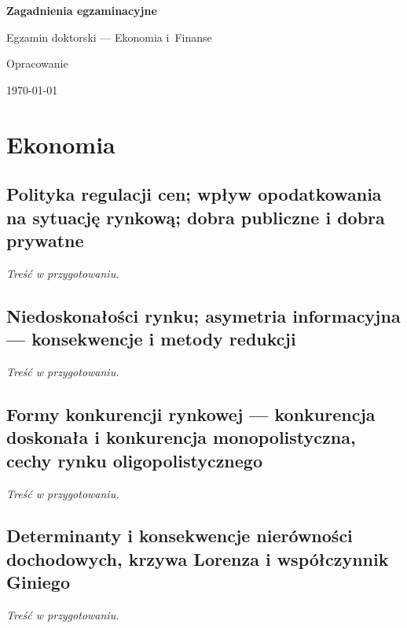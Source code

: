 \documentclass[12pt,a4paper]{report}
\begin{document}

\begin{titlepage}
  \centering
  \vspace*{4cm}
  {\LARGE\bfseries Zagadnienia egzaminacyjne\par}
  \vspace{6pt}
  {\Large Egzamin doktorski --- Ekonomia i~Finanse\par}
  \vspace{2cm}
  {\large Opracowanie\par}
  \vfill
  {\normalsize \today\par}
\end{titlepage}

{\singlespacing
\tableofcontents
}
\clearpage
{}

\chapter{Ekonomia}



\section[Regulacja cen, opodatkowanie, dobra publiczne i prywatne]{Polityka regulacji cen; wpływ opodatkowania na sytuację rynkową; dobra publiczne i dobra prywatne}
\textit{Treść w przygotowaniu.}

\section[Niedoskonałości rynku, asymetria informacji]{Niedoskonałości rynku; asymetria informacyjna --- konsekwencje i metody redukcji}
\textit{Treść w przygotowaniu.}

\section[Formy konkurencji: doskonała, monopolistyczna, oligopol]{Formy konkurencji rynkowej --- konkurencja doskonała i konkurencja monopolistyczna, cechy rynku oligopolistycznego}
\textit{Treść w przygotowaniu.}

\section[Nierówności dochodowe, krzywa Lorenza, współczynnik Giniego]{Determinanty i konsekwencje nierówności dochodowych, krzywa Lorenza i współczynnik Giniego}
\textit{Treść w przygotowaniu.}
\end{document}
